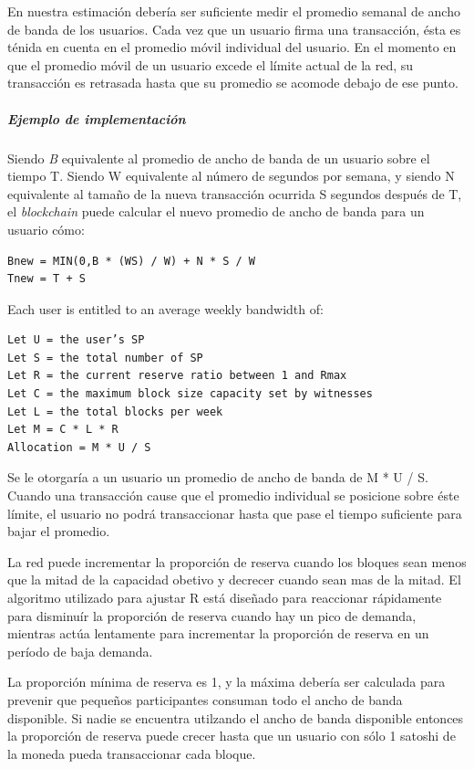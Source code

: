 \documentclass[a4paper,titlepage,final]{article}
\begin{document}
En nuestra estimación debería ser suficiente medir el promedio semanal de ancho de banda de los usuarios. Cada vez que un usuario firma una transacción, ésta es ténida en cuenta en el promedio móvil individual del usuario. En el momento en que el promedio móvil de un usuario excede el límite actual de la red, su transacción es retrasada hasta que su promedio se acomode debajo de ese punto.

\subparagraph{Ejemplo de implementación}

Siendo \textit{B} equivalente al promedio de ancho de banda de un usuario sobre el tiempo T. Siendo W equivalente al número de segundos por semana, y siendo N equivalente al tamaño de la nueva transacción ocurrida S segundos después de T, el \textit{blockchain} puede calcular el nuevo promedio de ancho de banda para un usuario cómo:

\begin{lstlisting}[frame=single]
Bnew = MIN(0,B * (W­S) / W) + N * S / W
Tnew = T + S
\end{lstlisting}

Each user is entitled to an average weekly bandwidth of:

\begin{lstlisting}[frame=single]
Let U = the user’s SP
Let S = the total number of SP
Let R = the current reserve ratio between 1 and Rmax
Let C = the maximum block size capacity set by witnesses
Let L = the total blocks per week
Let M = C * L * R
Allocation = M * U / S
\end{lstlisting}

Se le otorgaría a un usuario un promedio de ancho de banda de M * U / S. Cuando una transacción cause que el promedio individual se posicione sobre éste límite, el usuario no podrá transaccionar hasta que pase el tiempo suficiente para bajar el promedio.

La red puede incrementar la proporción de reserva cuando los bloques sean menos que la mitad de la capacidad obetivo y decrecer cuando sean mas de la mitad. El algoritmo utilizado para ajustar R está diseñado para reaccionar rápidamente para disminuír la proporción de reserva cuando hay un pico de demanda, mientras actúa lentamente para incrementar la proporción de reserva en un período de baja demanda.

La proporción mínima de reserva es 1, y la máxima debería ser calculada para prevenir que pequeños participantes consuman todo el ancho de banda disponible. Si nadie se encuentra utilzando el ancho de banda disponible entonces la proporción de reserva puede crecer hasta que un usuario con sólo 1 satoshi de la moneda pueda transaccionar cada bloque.
\end{document}
